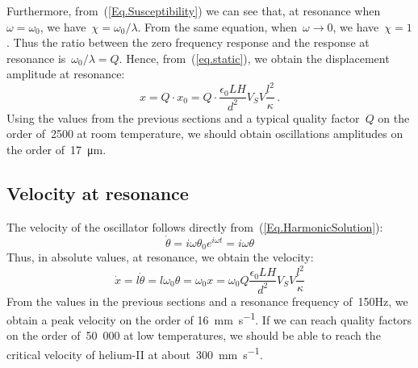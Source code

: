 Furthermore, from~(\ref{Eq.Susceptibility}) we can see that, at resonance when~$\omega=\omega_0$, we have~$\chi=\omega_0/\lambda$. From the same equation, when~$\omega\rightarrow 0$, we have~$\chi=1$. Thus the ratio between the zero frequency response and the response at resonance is~$\omega_0/\lambda=Q$. Hence, from~(\ref{eq.static}), we obtain the displacement amplitude at resonance:
\begin{equation}
\label{eq.amplitude}
x = Q\cdot x_0 = Q\cdot \frac{\epsilon_0 L H}{d^2} V_S V\frac{l^2}{\kappa} \,.
\end{equation}
Using the values from the previous sections and a typical quality factor~$Q$ on the order of~2500 at room temperature, we should obtain oscillations amplitudes on the order of~\si{\num{17}\micro\meter}.

\subsection{Velocity at resonance}
\label{sec.velocity}
The velocity of the oscillator follows directly from~(\ref{Eq.HarmonicSolution}):
\begin{equation}
\dot\theta=i\omega\theta_0 e^{i\omega t} = i\omega\theta
\end{equation}
Thus, in absolute values, at resonance, we obtain the velocity:
\begin{equation}
\label{eq.linearvelocity}
\dot x = l \dot \theta = l \omega_0 \theta = \omega_0 x 
=  \omega_0 Q \frac{\epsilon_0 L H}{d^2} V_S V\frac{l^2}{\kappa}
\end{equation}
From the values in the previous sections and a resonance frequency of~150Hz, we obtain a peak velocity on the order of \si{\num{16}\milli\meter\per\second}. If we can reach quality factors on the order of~50~000 at low temperatures, we should be able to reach the critical velocity of helium-II at about~\si{\num{300}\milli\meter\per\second}.

